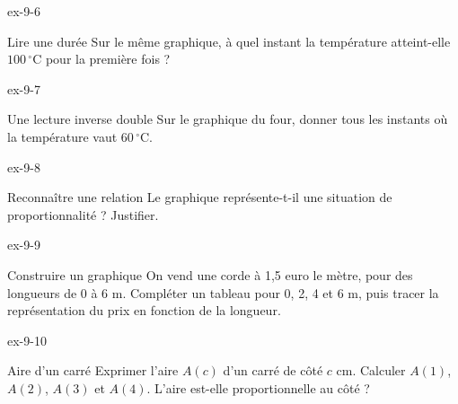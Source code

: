 \begin{blocLivre}{ex-9-6}\begin{exercice}[2]{Lire une durée}
Sur le même graphique, à quel instant la température atteint-elle $100\,^\circ$C pour la première fois ?
\label{fig-ex-9-6}
\end{exercice}\end{blocLivre}
\begin{blocLivre}{ex-9-7}\begin{exercice}[2]{Une lecture inverse double}
Sur le graphique du four, donner tous les instants où la température vaut $60\,^\circ$C.
\label{fig-ex-9-7}
\end{exercice}\end{blocLivre}
\begin{blocLivre}{ex-9-8}\begin{exercice}[2]{Reconnaître une relation}
Le graphique représente-t-il une situation de proportionnalité ? Justifier.
\label{fig-ex-9-8}
\end{exercice}\end{blocLivre}
\begin{blocLivre}{ex-9-9}\begin{exercice}[2]{Construire un graphique}
On vend une corde à 1,5 euro le mètre, pour des longueurs de 0 à 6 m. Compléter un tableau pour 0, 2, 4 et 6 m, puis tracer la représentation du prix en fonction de la longueur.
\label{fig-ex-9-9}
\end{exercice}\end{blocLivre}
\begin{blocLivre}{ex-9-10}\begin{exercice}[2]{Aire d’un carré}
Exprimer l’aire $A(c)$ d’un carré de côté $c$ cm. Calculer $A(1)$, $A(2)$, $A(3)$ et $A(4)$. L’aire est-elle proportionnelle au côté ?
\label{fig-ex-9-10}
\end{exercice}\end{blocLivre}

